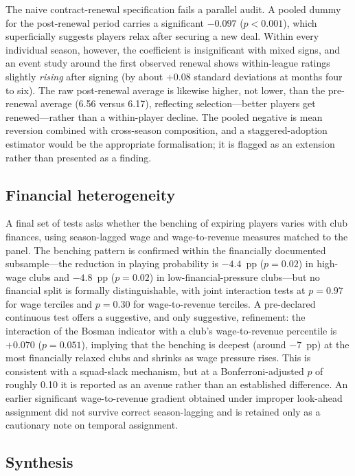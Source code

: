 \documentclass{article}
\begin{document}
The naive contract-renewal specification fails a parallel audit. A pooled dummy
for the post-renewal period carries a significant $-0.097$ ($p < 0.001$), which
superficially suggests players relax after securing a new deal. Within every
individual season, however, the coefficient is insignificant with mixed signs,
and an event study around the first observed renewal shows within-league ratings
slightly \emph{rising} after signing (by about $+0.08$ standard deviations at
months four to six). The raw post-renewal average is likewise higher, not lower,
than the pre-renewal average (6.56 versus 6.17), reflecting selection---better
players get renewed---rather than a within-player decline. The pooled negative is
mean reversion combined with cross-season composition, and a staggered-adoption
estimator would be the appropriate formalisation; it is flagged as an extension
rather than presented as a finding.

\subsection{Financial heterogeneity}
\label{sec:results-financial}

A final set of tests asks whether the benching of expiring players varies with
club finances, using season-lagged wage and wage-to-revenue measures matched to
the panel. The benching pattern is confirmed within the financially documented
subsample---the reduction in playing probability is $-4.4$~pp ($p = 0.02$) in
high-wage clubs and $-4.8$~pp ($p = 0.02$) in low-financial-pressure
clubs---but no financial split is formally distinguishable, with joint
interaction tests at $p = 0.97$ for wage terciles and $p = 0.30$ for
wage-to-revenue terciles. A pre-declared continuous test offers a suggestive,
and only suggestive, refinement: the interaction of the Bosman indicator with a
club's wage-to-revenue percentile is $+0.070$ ($p = 0.051$), implying that the
benching is deepest (around $-7$~pp) at the most financially relaxed clubs and
shrinks as wage pressure rises. This is consistent with a squad-slack mechanism,
but at a Bonferroni-adjusted $p$ of roughly 0.10 it is reported as an avenue
rather than an established difference. An earlier significant wage-to-revenue
gradient obtained under improper look-ahead assignment did not survive correct
season-lagging and is retained only as a cautionary note on temporal assignment.

\subsection{Synthesis}
\label{sec:results-synthesis}
\end{document}
